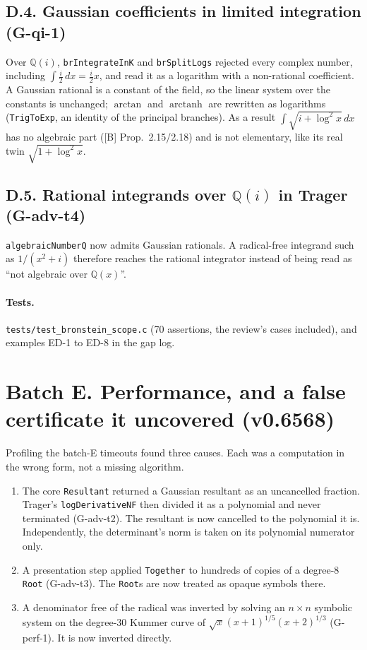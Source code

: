 \documentclass[11pt]{article}
\theoremstyle{definition}
\theoremstyle{remark}
\newcommand{\Q}{\mathbb{Q}}
\newcommand{\code}[1]{\texttt{#1}}
\begin{document}
\subsection*{D.4. Gaussian coefficients in limited integration (G-qi-1)}

Over $\Q(i)$, \code{brIntegrateInK} and \code{brSplitLogs} rejected every
complex number, including $\int\frac i2\,dx=\frac i2x$, and read it as a
logarithm with a non-rational coefficient. A Gaussian rational is a constant of
the field, so the linear system over the constants is unchanged; $\arctan$ and
$\operatorname{arctanh}$ are rewritten as logarithms (\code{TrigToExp}, an
identity of the principal branches). As a result
$\int\sqrt{i+\log^2x}\,dx$ has no algebraic part ([B] Prop.~2.15/2.18) and is
not elementary, like its real twin $\sqrt{1+\log^2x}$.

\subsection*{D.5. Rational integrands over $\Q(i)$ in Trager (G-adv-t4)}

\code{algebraicNumberQ} now admits Gaussian rationals. A radical-free integrand
such as $1/(x^2+i)$ therefore reaches the rational integrator instead of being
read as ``not algebraic over $\Q(x)$''.

\paragraph{Tests.} \code{tests/test\_bronstein\_scope.c} (70 assertions, the review's cases included), and
examples ED-1 to ED-8 in the gap log.


\section*{Batch E. Performance, and a false certificate it uncovered (v0.6568)}

Profiling the batch-E timeouts found three causes. Each was a computation in
the wrong form, not a missing algorithm.

\begin{enumerate}
\item The core \code{Resultant} returned a Gaussian resultant as an
  uncancelled fraction. Trager's \code{logDerivativeNF} then divided it as a
  polynomial and never terminated (G-adv-t2). The resultant is now cancelled
  to the polynomial it is. Independently, the determinant's norm is taken on
  its polynomial numerator only.
\item A presentation step applied \code{Together} to hundreds of copies of a
  degree-8 \code{Root} (G-adv-t3). The \code{Root}s are now treated as opaque
  symbols there.
\item A denominator free of the radical was inverted by solving an
  $n\times n$ symbolic system on the degree-30 Kummer curve of
  $\sqrt x(x+1)^{1/5}(x+2)^{1/3}$ (G-perf-1). It is now inverted directly.
\end{enumerate}
\end{document}
